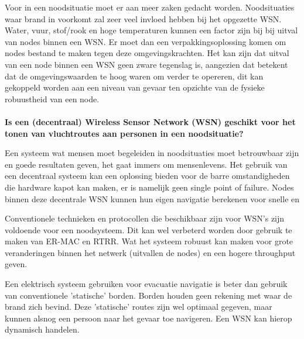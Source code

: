 Voor in een noodsituatie moet er aan meer zaken gedacht worden. Noodsituaties waar brand in voorkomt zal zeer veel invloed hebben bij het opgezette WSN. Water, vuur, stof/rook en hoge temperaturen kunnen een factor zijn bij bij uitval van nodes binnen een WSN. Er moet dan een verpakkingsoplossing komen om nodes bestand te maken tegen deze omgevingskrachten. Het kan zijn dat uitval van een node binnen een WSN geen zware tegenslag is, aangezien dat betekent dat de omgevingswaarden te hoog waren om verder te opereren, dit kan gekoppeld worden aan een niveau van gevaar ten opzichte van de fysieke robuustheid van een node. 
\\\\
\textbf{Is een (decentraal) Wireless Sensor Network (WSN) geschikt voor het tonen van vluchtroutes aan personen in een noodsituatie?}

Een systeem wat mensen moet begeleiden in noodsituaties moet betrouwbaar zijn en goede resultaten geven, het gaat immers om mensenlevens. Het gebruik van een decentraal systeem kan een oplossing bieden voor de barre omstandigheden die hardware kapot kan maken, er is namelijk geen single point of failure. Nodes binnen deze decentrale WSN kunnen hun eigen navigatie berekenen voor snelle en

Conventionele technieken en protocollen die beschikbaar zijn voor WSN's zijn voldoende voor een noodsysteem. Dit kan wel verbeterd worden door gebruik te maken van ER-MAC en RTRR. Wat het systeem robuust kan maken voor grote veranderingen binnen het netwerk (uitvallen de nodes) en een hogere throughput geven.

Een elektrisch systeem gebruiken voor evacuatie navigatie is beter dan gebruik van conventionele 'statische' borden. Borden houden geen rekening met waar de brand zich bevind. Deze 'statische' routes zijn wel optimaal gegeven, maar kunnen alsnog een persoon naar het gevaar toe navigeren. Een WSN kan hierop dynamisch handelen.

